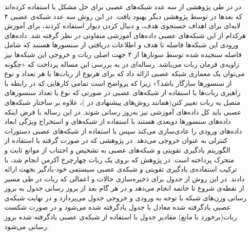 در  در طی پژوهشی از سه عدد شبکه‌های عصبی برای حل مشکل  با استفاده کرده‌اند که بعدها در  توسط پژوهشی دیگر بهبود یافت. در این روش سه عدد شبکه‌ی عصبی ۴ لایه‌ای برای اهداف جستجوی هدف،  و دنبال کردن دیوار استفاده کردند، برای آموزش هرکدام از این شبکه‌های عصبی داده‌های آموزشی متفاوتی در نظر گرفته شد. داده‌های ورودی این شبکه‌ها فاصله تا هدف و اطلاعات دریافتی از سنسورها هستند که شامل فاصله سنجیده شده توسط سونارها از ۴ جهت اصلی ربات و خروجی این شبکه‌ها نیز زاویه‌ی فرمان ربات می‌باشد.
رساله‌ای در  به بررسی این مساله پرداخت که «چگونه می‌توان یک معماری شبکه عصبی ارائه داد که برای هرنوع از ربات‌ها با هر تعداد و نوع از سنسورها سازگار باشد؟» زیرا که پرواضح است تمامی کارهایی که در رابطه با راهبری ربات‌ها با استفاده از شبکه‌های عصبی در صورتی که نوع یا تعداد سنسورهای متصل به ربات تغییر کنن(همانند روش‌های پیشنهادی در )، علاوه بر ساختار شبکه‌های عصبی باید کل داده‌های آموزشی نیز به‌روز رسانی شوند. در این رساله با فرض اینکه داده‌های سنسورها دوبعدی هستند با استفاده از شبکه‌های  و استخراج ویژگی  ابعاد داده‌های ورودی را عادی‌سازی می‌کند سپس با استفاده از شبکه‌های عصبی دستورات کنترلی به عنوان خروجی می‌دهد.
در پژوهشی که در  صورت گرفته با استفاده از الگوریتم یادگیری تقویتی  و شبکه‌های عصبی به تشخیص و اجتناب از موانع ثابت و متحرک پرداخته است. در پژوهش که بروی یک ربات چهارچرخ آکرمن انجام شد، با ترکیب استفاده‌ی یادگیری تقویتی و شبکه‌ی عصبی سیستمی خود-یادگیر بجهت  ارائه دادند. در این روش از جدول  برای ذخیره‌سازی حالات و اعمالی که ربات در طی مسیر از نقطه‌ی شروع تا خاتمه انجام می‌دهد و در هر گام بعد از بروز رسانی جدول  به بروز رسانی وزن‌های شبکه با توجه به ورودی و خروجی جدول  می‌پردازد و در نهایت شبکه‌ی عصبی یادگرفته شده معادل با جدول یادگرفته شده  می‌شود و در صورت شکست ربات(برخورد با مانع) مقادیر جدول  با استفاده از شبکه‌ی عصبی یادگرفته شده بروز رسانی می‌شود.